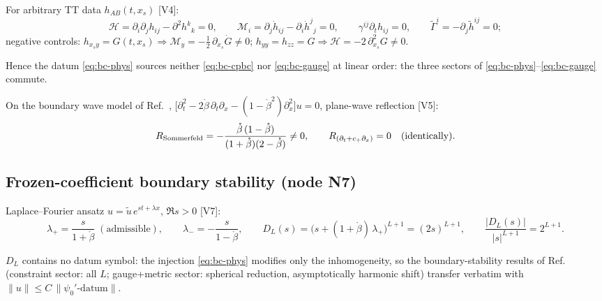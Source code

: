 For arbitrary TT data $h_{AB}(t,x_s)$ [V4]:
\begin{equation}
\mathcal H = \partial_i\partial_j h_{ij} - \partial^2 h^k{}_k = 0,
\qquad
\mathcal M_i = \partial_j \dot h_{ij} - \partial_i \dot h^j{}_j = 0,
\qquad
\gamma^{ij}\partial_t h_{ij} = 0,
\qquad
\tilde\Gamma^i = -\partial_j \tilde h^{ij} = 0 ;
\label{eq:orthogonality}
\end{equation}
negative controls:
$h_{x_s y}=G(t,x_s)\Rightarrow \mathcal M_y = -\tfrac12\,\partial_{x_s}\dot G \neq 0$;
$h_{yy}=h_{zz}=G \Rightarrow \mathcal H = -2\,\partial_{x_s}^2 G \neq 0$.
\begin{nfblock}
Hence the datum \eqref{eq:bc-phys} sources neither
\eqref{eq:bc-cpbc} nor \eqref{eq:bc-gauge} at linear order: the three
sectors of \eqref{eq:bc-phys}--\eqref{eq:bc-gauge} commute.
\end{nfblock}
On the boundary wave model of Ref.~\cite{Ruiz:2010qj},
$\big[\partial_t^2 - 2\mathring\beta\,\partial_t\partial_x
 - (1-\mathring\beta^2)\partial_x^2\big]u = 0$, plane-wave reflection [V5]:
\begin{equation}
R_{\rm Sommerfeld}
 = -\frac{\mathring\beta\,(1-\mathring\beta)}
        {(1+\mathring\beta)(2-\mathring\beta)} \neq 0,
\qquad
R_{(\partial_t + c_+\partial_x)} = 0
\quad\text{(identically)} .
\label{eq:reflection}
\end{equation}

\subsection{Frozen-coefficient boundary stability (node N7)}
\label{sec:n7}

Laplace--Fourier ansatz $u = \tilde u\,e^{st+\lambda x}$, $\Re s>0$ [V7]:
\begin{equation}
\lambda_+ = \frac{s}{1+\mathring\beta}\;(\text{admissible}),
\qquad
\lambda_- = -\frac{s}{1-\mathring\beta},
\qquad
D_L(s) = \Big(s + (1+\mathring\beta)\,\lambda_+\Big)^{L+1} = (2s)^{L+1},
\qquad
\frac{|D_L(s)|}{|s|^{L+1}} = 2^{L+1} .
\label{eq:kreiss}
\end{equation}
\begin{nfblock}
$D_L$ contains no datum symbol: the injection \eqref{eq:bc-phys} modifies
only the inhomogeneity, so the boundary-stability results of
Ref.~\cite{Ruiz:2010qj} (constraint sector: all $L$; gauge+metric sector:
spherical reduction, asymptotically harmonic shift) transfer verbatim with
$\|u\| \le C\,\|\psi_0'\text{-datum}\|$.
\end{nfblock}

